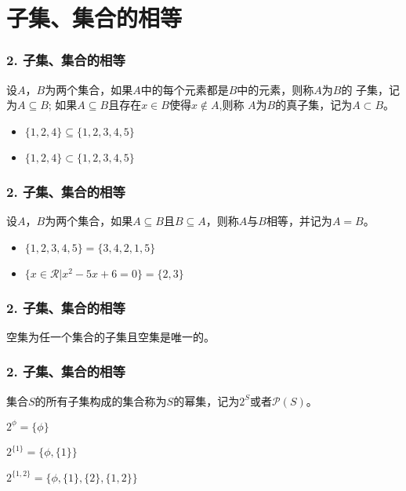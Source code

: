 \documentclass{beamer}
\begin{document}
\begin{CJK*}{UTF8}{gbsn}
\begin{frame}
\end{frame}

\section{子集、集合的相等}
\begin{frame}
  \frametitle{2. 子集、集合的相等}

  \begin{Def}\justifying\let\raggedright\justifying
    设$A$，$B$为两个集合，如果$A$中的每个元素都是$B$中的元素，则称$A$为$B$的
\alert{子集}，记为$A \subseteq B$; 如果$A \subseteq B$且存在$x\in B$使得$x \notin A$,则称 $A$为$B$的\alert{真子集}，记为$A\subset B$。    
\end{Def}
  \begin{itemize}
\pause
  \item   $\{1,2,4\} \subseteq \{1,2,3,4,5\}$
\pause
\item $\{1,2,4\} \subset \{1,2,3,4,5\}$
  \end{itemize}
\end{frame}
\begin{frame}
  \frametitle{2. 子集、集合的相等}
  \begin{Def}
    设$A$，$B$为两个集合，如果$A \subseteq B$且$B \subseteq A$，则称$A$与$B$\alert{相等}，并记为$A=B$。
  \end{Def}
    \begin{itemize}
\pause
  \item   $\{1,2,3,4,5\} = \{3,4,2,1,5\}$
\pause
\item $\{x \in \mathcal{R} | x^2 -5x + 6 = 0\} = \{2,3\}$
  \end{itemize}

\end{frame}
\begin{frame}
  \frametitle{2. 子集、集合的相等}
  \begin{Thm}
   空集为任一个集合的子集且空集是唯一的。 
  \end{Thm}
\end{frame}
\begin{frame}
  \frametitle{2. 子集、集合的相等}
\begin{Def}
  集合$S$的所有子集构成的集合称为$S$的幂集，记为$2^S$或者$\mathcal{P}(S)$。
\end{Def}\pause
\begin{Ex}
    $2^{\phi}=\{\phi\}$

    $2^{\{1\}}=\{\phi, \{1\}\}$

  $2^{\{1,2\}}=\{\phi, \{1\},\{2\},\{1,2\}\}$
  

\end{Ex}
\end{frame}
\end{CJK*}
\end{document}
